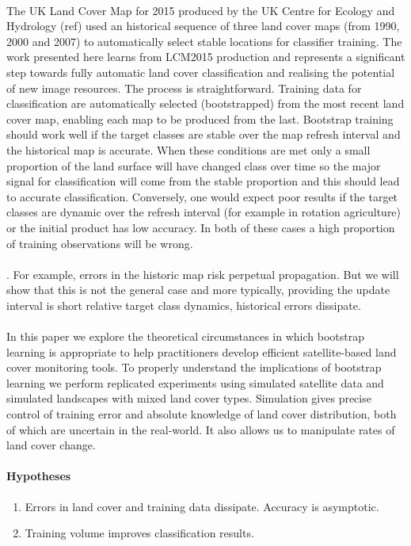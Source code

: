 \paragraph{}The UK Land Cover Map for 2015 produced by the UK Centre for Ecology and Hydrology (ref) used an historical sequence of three land cover maps (from 1990, 2000 and 2007) to automatically select stable locations for classifier training.  The work presented here learns from LCM2015 production and represents a significant step towards fully automatic land cover classification and realising the potential of new image resources.  The process is straightforward.  Training data for classification are automatically selected (bootstrapped) from the most recent land cover map, enabling each map to be produced from the last.  Bootstrap training should work well if the target classes are stable over the map refresh interval and the historical map is accurate.  When these conditions are met only a small proportion of the land surface will have changed class over time so the major signal for classification will come from the stable proportion and this should lead to accurate classification. Conversely, one would expect poor results if the target classes are dynamic over the refresh interval (for example in rotation agriculture) or the initial product has low accuracy.  In both of these cases a high proportion of training observations will be wrong.  

\paragraph{}.   For example, errors in the historic map risk perpetual propagation.  But we will show that this is not the general case and more typically, providing the update interval is short relative target class dynamics, historical errors dissipate.   
\paragraph{}

\paragraph{}
In this paper we explore the theoretical circumstances in which bootstrap learning is appropriate to help practitioners develop efficient satellite-based land cover monitoring tools.  To properly understand the implications of bootstrap learning we perform replicated experiments using simulated satellite data and simulated landscapes with mixed land cover types.  Simulation gives precise control of training error and absolute knowledge of land cover distribution, both of which are uncertain in the real-world. It also allows us to manipulate rates of land cover change.  

\paragraph{Hypotheses}
\begin{enumerate}
	\item Errors in land cover and training data dissipate.  Accuracy is asymptotic.
	\item Training volume improves classification results.
\end{enumerate}
 
